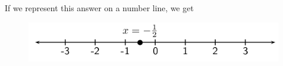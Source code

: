       
      \label{m39254*id157620}If we represent this answer on a number line, we get\par 
      \label{m39254*id157626}
        
    \setcounter{subfigure}{0}


	\begin{figure}[H] %
    \begin{center}
    \label{m39254*id157630!!!underscore!!!media}\label{m39254*id157630!!!underscore!!!printimage}\includegraphics[width=.8\columnwidth]{col11306.imgs/m39254_MG10C10_001.png} %
        
      \vspace{2pt}
    \vspace{.1in}
    
    \end{center}

 \end{figure}   

    \addtocounter{footnote}{-0}
    
